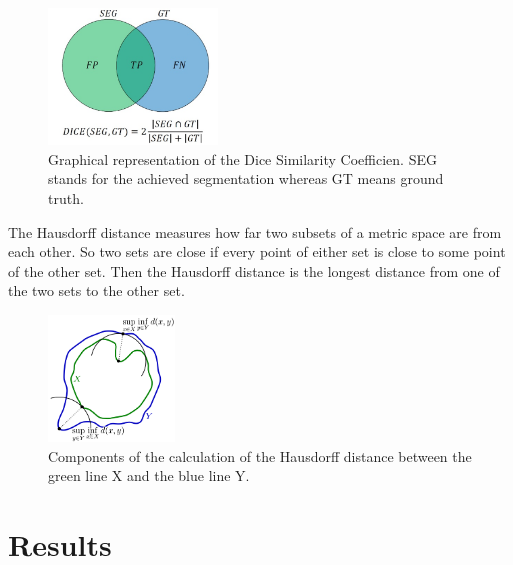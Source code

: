 \documentclass[conference]{IEEEtran}
\begin{document}
	\begin{figure}[h]
		\centering
		\includegraphics[width=0.4\textwidth]{diceGraphics.png}
		\caption{Graphical representation of the Dice Similarity Coefficien. SEG stands for the achieved segmentation whereas GT means ground truth.}
		\label{fig:figure2}
	\end{figure}

	The Hausdorff distance measures how far two subsets of a metric space are from each other. So two sets are close if every point of either set is close 
	to some point of the other set. Then the Hausdorff distance is the longest distance from one of the two sets to the other set.
	\begin{figure}[h]
		\centering
		\includegraphics[width=0.3\textwidth]{haussdorfGraphics.png}
		\caption{Components of the calculation of the Hausdorff distance between the green line X and the blue line Y.}
		\label{fig:figure3}
	\end{figure}



\section{Results}
\end{document}
